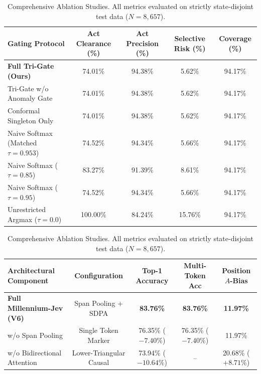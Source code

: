 \begin{table}[t]
\centering
\small
\begin{subtable}[t]{\textwidth}
\centering
\begin{tabular}{lcccc}
\toprule
\textbf{Gating Protocol} & \textbf{Act Clearance (\%)} & \textbf{Act Precision (\%)} & \textbf{Selective Risk (\%)} & \textbf{Coverage (\%)} \\
\midrule
\textbf{Full Tri-Gate (Ours)} & 74.01\% & 94.38\% & 5.62\% & 94.17\% \\
Tri-Gate w/o Anomaly Gate & 74.01\% & 94.38\% & 5.62\% & 94.17\% \\
Conformal Singleton Only & 74.01\% & 94.38\% & 5.62\% & 94.17\% \\
Naive Softmax (Matched $\tau=0.953$) & 74.52\% & 94.34\% & 5.66\% & 94.17\% \\
Naive Softmax ($\tau=0.85$) & 83.27\% & 91.39\% & 8.61\% & 94.17\% \\
Naive Softmax ($\tau=0.95$) & 74.52\% & 94.34\% & 5.66\% & 94.17\% \\
Unrestricted Argmax ($\tau=0.0$) & 100.00\% & 84.24\% & 15.76\% & 94.17\% \\
\bottomrule
\end{tabular}
\caption{Ablation 2A: Gating Policy & Trustworthy Decision Making under Conformal Boundaries.}
\label{tab:ablation_gating}
\end{subtable}

\vspace{2mm}
\begin{subtable}[t]{\textwidth}
\centering
\begin{tabular}{lcccc}
\toprule
\textbf{Architectural Component} & \textbf{Configuration} & \textbf{Top-1 Accuracy} & \textbf{Multi-Token Acc} & \textbf{Position $A$-Bias} \\
\midrule
\textbf{Full Millennium-Jev (V6)} & Span Pooling + SDPA & \textbf{83.76\%} & \textbf{83.76\%} & \textbf{11.97\%} \\
w/o Span Pooling & Single Token Marker & 76.35\% ($-7.40\%$) & 76.35\% ($-7.40\%$) & 11.97\% \\
w/o Bidirectional Attention & Lower-Triangular Causal & 73.94\% ($-10.64\%$) & -- & 20.68\% ($+8.71\%$) \\
\bottomrule
\end{tabular}
\caption{Ablation 2B: Architectural Component Breakdown on Disjoint Representation Learning.}
\label{tab:ablation_architecture}
\end{subtable}
\caption{Comprehensive Ablation Studies. All metrics evaluated on strictly state-disjoint test data ($N=8,657$).}
\label{tab:main_ablation}
\end{table}